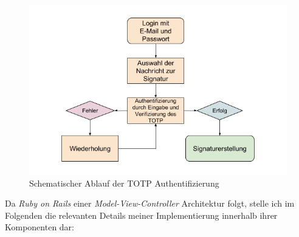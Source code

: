 \documentclass[11pt,a4paper,ngerman]{scrreprt}
\begin{document}
\begin{figure}[htbp]
    \centering
        \includegraphics[width=\textwidth]{Abbildungen/Ablauf_TOTP}
    \caption{Schematischer Ablauf der TOTP Authentifizierung}
    \label{fig:totp}
\end{figure}
\clearpage

Da \textit{Ruby on Rails} einer \textit{Model-View-Controller} Architektur folgt, stelle ich im Folgenden die relevanten Details meiner Implementierung innerhalb ihrer Komponenten dar:
\end{document}
